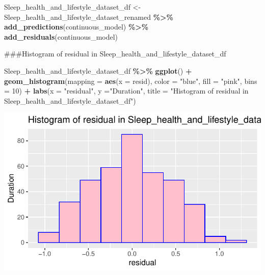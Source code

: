 \documentclass[
  11pt,
]{article}
\newenvironment{Shaded}{\begin{snugshade}}{\end{snugshade}}
\newcommand{\AttributeTok}[1]{\textcolor[rgb]{0.13,0.29,0.53}{#1}}
\newcommand{\DecValTok}[1]{\textcolor[rgb]{0.00,0.00,0.81}{#1}}
\newcommand{\FunctionTok}[1]{\textcolor[rgb]{0.13,0.29,0.53}{\textbf{#1}}}
\newcommand{\NormalTok}[1]{#1}
\newcommand{\OtherTok}[1]{\textcolor[rgb]{0.56,0.35,0.01}{#1}}
\newcommand{\SpecialCharTok}[1]{\textcolor[rgb]{0.81,0.36,0.00}{\textbf{#1}}}
\newcommand{\StringTok}[1]{\textcolor[rgb]{0.31,0.60,0.02}{#1}}
\begin{document}
\begin{Shaded}
\end{Shaded}

\begin{Shaded}
\begin{Highlighting}[]
\NormalTok{Sleep\_health\_and\_lifestyle\_dataset\_df }\OtherTok{\textless{}{-}}\NormalTok{ Sleep\_health\_and\_lifestyle\_dataset\_renamed }\SpecialCharTok{\%\textgreater{}\%}
  \FunctionTok{add\_predictions}\NormalTok{(continuous\_model) }\SpecialCharTok{\%\textgreater{}\%}
  \FunctionTok{add\_residuals}\NormalTok{(continuous\_model)}
\end{Highlighting}
\end{Shaded}

\#\#\#Histogram of residual in
Sleep\_health\_and\_lifestyle\_dataset\_df

\begin{Shaded}
\begin{Highlighting}[]
\NormalTok{Sleep\_health\_and\_lifestyle\_dataset\_df }\SpecialCharTok{\%\textgreater{}\%}
  \FunctionTok{ggplot}\NormalTok{() }\SpecialCharTok{+}
  \FunctionTok{geom\_histogram}\NormalTok{(}\AttributeTok{mapping =} \FunctionTok{aes}\NormalTok{(}\AttributeTok{x =}\NormalTok{ resid), }\AttributeTok{color =} \StringTok{"blue"}\NormalTok{, }\AttributeTok{fill =} \StringTok{"pink"}\NormalTok{, }\AttributeTok{bins =} \DecValTok{10}\NormalTok{) }\SpecialCharTok{+}
  \FunctionTok{labs}\NormalTok{(}\AttributeTok{x =} \StringTok{"residual"}\NormalTok{, }\AttributeTok{y =}\StringTok{"Duration"}\NormalTok{,}
\AttributeTok{title =} \StringTok{"Histogram of residual in Sleep\_health\_and\_lifestyle\_dataset\_df"}\NormalTok{)}
\end{Highlighting}
\end{Shaded}

\begin{center}\includegraphics[width=0.7\linewidth]{SleepHelath_files/figure-latex/unnamed-chunk-34-1} \end{center}
\end{document}
